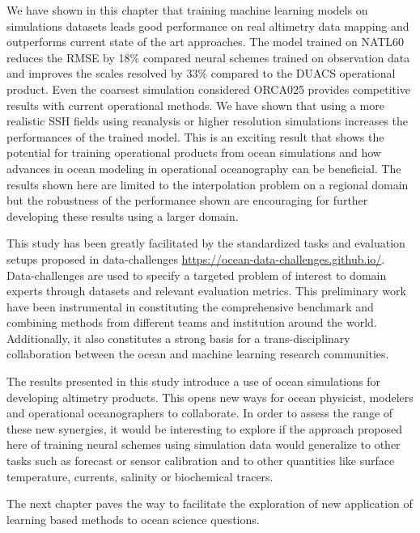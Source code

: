 \begin{bibunit}
We have shown in this chapter that training machine learning models on simulations datasets leads good performance on real altimetry data mapping and outperforms current state of the art approaches. The model trained on NATL60 reduces the RMSE by 18\% compared neural schemes trained on observation data and improves the scales resolved by 33\% compared to the DUACS operational product. Even the coarsest simulation considered ORCA025 provides competitive results with current operational methods. We have shown that using a more realistic SSH fields using reanalysis or higher resolution simulations increases the performances of the trained model. This is an exciting result that shows the potential for training operational products from ocean simulations and how advances in ocean modeling in operational oceanography can be beneficial. The results shown here are limited to the interpolation problem on a regional domain but the robustness of the performance shown are encouraging for further developing these results using a larger domain.

This study has been greatly facilitated by the standardized tasks and evaluation setups proposed in data-challenges \url{https://ocean-data-challenges.github.io/}. Data-challenges are used to specify a targeted problem of interest to domain experts through datasets and relevant evaluation metrics. This preliminary work have been instrumental in constituting the comprehensive benchmark and combining methods from different teams and institution around the world. Additionally, it also constitutes a strong basis for a trans-disciplinary collaboration between the ocean and machine learning research communities.

The results presented in this study introduce a use of ocean simulations for developing altimetry products. This opens new ways for ocean physicist, modelers and operational oceanographers to collaborate. In order to assess the range of these new synergies, it would be interesting to explore if the approach proposed here of training neural schemes using simulation data would generalize to other tasks such as forecast or sensor calibration and to other quantities like surface temperature, currents, salinity or biochemical tracers.

The next chapter paves the way to facilitate the exploration of new application of learning based methods to ocean science questions.



\end{bibunit}
